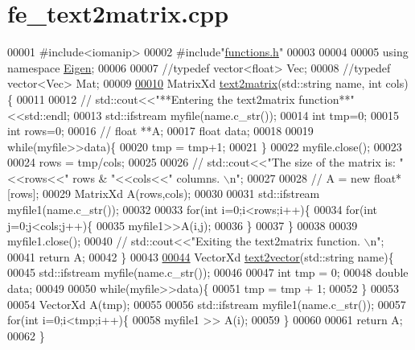 \hypertarget{fe__text2matrix_8cpp_source}{}\section{fe\+\_\+text2matrix.\+cpp}
\label{fe__text2matrix_8cpp_source}

\begin{DoxyCode}
00001 \textcolor{preprocessor}{#include<iomanip>}
00002 \textcolor{preprocessor}{#include"\hyperlink{functions_8h}{functions.h}"}
00003 
00004 
00005 \textcolor{keyword}{using namespace }\hyperlink{namespace_eigen}{Eigen};
00006 
00007 \textcolor{comment}{//typedef vector<float> Vec;}
00008 \textcolor{comment}{//typedef vector<Vec> Mat;}
00009 
\hyperlink{fe__text2matrix_8cpp_add4fca63e194477644c3388febf88023}{00010} MatrixXd \hyperlink{fe__text2matrix_8cpp_add4fca63e194477644c3388febf88023}{text2matrix}(std::string name, \textcolor{keywordtype}{int} cols)\{
00011 
00012     \textcolor{comment}{// std::cout<<"**Entering the text2matrix function**"<<std::endl;}
00013         std::ifstream myfile(name.c\_str());
00014         \textcolor{keywordtype}{int} tmp=0;
00015         \textcolor{keywordtype}{int} rows=0;
00016         \textcolor{comment}{// float **A;}
00017         \textcolor{keywordtype}{float} data;
00018 
00019         \textcolor{keywordflow}{while}(myfile>>data)\{
00020                 tmp = tmp+1;
00021         \}
00022         myfile.close();
00023 
00024         rows = tmp/cols;
00025 
00026         \textcolor{comment}{// std::cout<<"The size of the matrix is: "<<rows<<" rows & "<<cols<<" columns. \(\backslash\)n";}
00027 
00028         \textcolor{comment}{// A = new float*[rows];}
00029         MatrixXd A(rows,cols);
00030 
00031         std::ifstream myfile1(name.c\_str());
00032 
00033         \textcolor{keywordflow}{for}(\textcolor{keywordtype}{int} i=0;i<rows;i++)\{
00034                 \textcolor{keywordflow}{for}(\textcolor{keywordtype}{int} j=0;j<cols;j++)\{
00035                         myfile1>>A(i,j);
00036                 \}
00037         \}
00038 
00039         myfile1.close();
00040     \textcolor{comment}{// std::cout<<"Exiting the text2matrix function. \(\backslash\)n";}
00041         \textcolor{keywordflow}{return} A;
00042 \}
00043 
\hyperlink{fe__text2matrix_8cpp_a708d7eae199de06b3c6627cc90bf569e}{00044} VectorXd \hyperlink{fe__text2matrix_8cpp_a708d7eae199de06b3c6627cc90bf569e}{text2vector}(std::string name)\{
00045         std::ifstream myfile(name.c\_str());
00046 
00047         \textcolor{keywordtype}{int} tmp = 0;
00048         \textcolor{keywordtype}{double} data;
00049         
00050         \textcolor{keywordflow}{while}(myfile>>data)\{
00051           tmp = tmp + 1;
00052         \}
00053 
00054         VectorXd A(tmp);
00055 
00056         std::ifstream myfile1(name.c\_str());
00057         \textcolor{keywordflow}{for}(\textcolor{keywordtype}{int} i=0;i<tmp;i++)\{
00058           myfile1 >> A(i);
00059         \}
00060 
00061         \textcolor{keywordflow}{return} A;
00062 \}
\end{DoxyCode}
